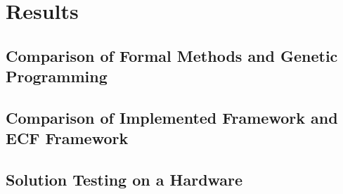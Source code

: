 \chapter{Results}
\section{Comparison of Formal Methods and Genetic Programming}
\section{Comparison of Implemented Framework and ECF Framework}
\section{Solution Testing on a Hardware}